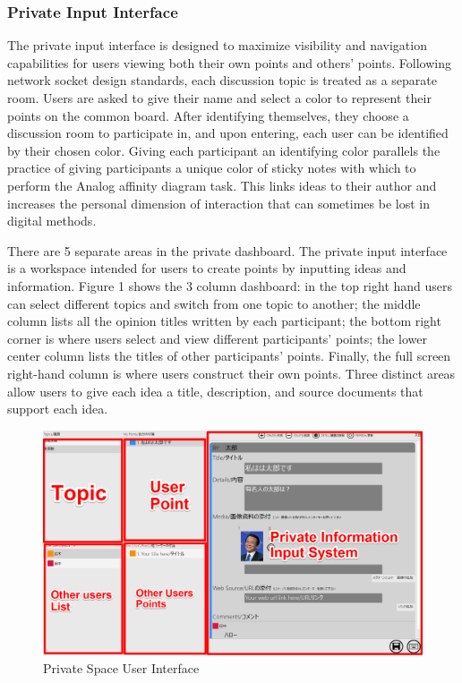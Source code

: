 \documentclass{sigchi}
\begin{document}
\subsubsection{Private Input Interface}

The private input interface is designed to maximize visibility and navigation capabilities for users viewing both their own points and others' points. Following network socket design standards, each discussion topic is treated as a separate room. Users are asked to give their name and select a color to represent their points on the common board. After identifying themselves, they choose a discussion room to participate in, and upon entering, each user can be identified by their chosen color. Giving each participant an identifying color parallels the practice of giving participants a unique color of sticky notes with which to perform the Analog affinity diagram task. This links ideas to their author and increases the personal dimension of interaction that can sometimes be lost in digital methods\cite{Ballendat:2010:PID:1936652.1936676}.  

There are 5 separate areas in the private dashboard. The private input interface is a workspace intended for users to create points by inputting ideas and information. Figure 1 shows the 3 column dashboard: in the top right hand users can select different topics and switch from one topic to another; the middle column lists all the opinion titles written by each participant; the bottom right corner is where users select and view different participants' points; the lower center column lists the titles of other participants' points. Finally, the full screen right-hand column is where users construct their own points. Three distinct areas allow users to give each idea a title, description, and source documents that support each idea. 

\begin{figure}
\centering
\includegraphics[width=1.0\columnwidth]{private}
\caption{Private Space User Interface}
\label{fig:figure1}
\end{figure}
\end{document}
